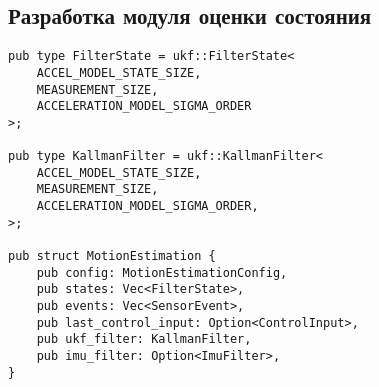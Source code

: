 \subsection{Разработка модуля оценки состояния}

\begin{lstlisting}
pub type FilterState = ukf::FilterState<
    ACCEL_MODEL_STATE_SIZE,
    MEASUREMENT_SIZE,
    ACCELERATION_MODEL_SIGMA_ORDER
>;

pub type KallmanFilter = ukf::KallmanFilter<
    ACCEL_MODEL_STATE_SIZE,
    MEASUREMENT_SIZE,
    ACCELERATION_MODEL_SIGMA_ORDER,
>;

pub struct MotionEstimation {
    pub config: MotionEstimationConfig,
    pub states: Vec<FilterState>,
    pub events: Vec<SensorEvent>,
    pub last_control_input: Option<ControlInput>,
    pub ukf_filter: KallmanFilter,
    pub imu_filter: Option<ImuFilter>,
}
\end{lstlisting}


